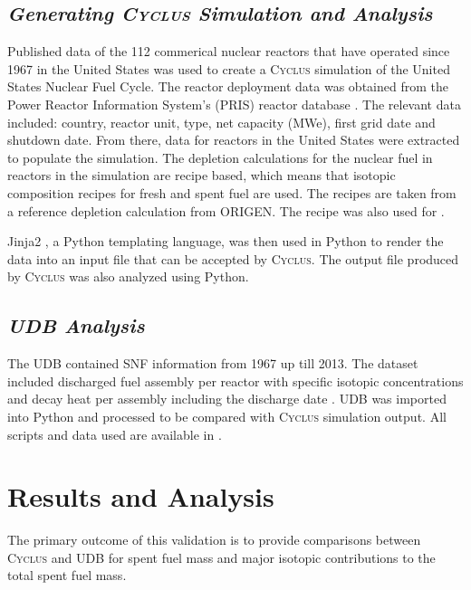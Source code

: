 \documentclass{anstrans}
\newcommand{\Cyclus}{\textsc{Cyclus}\xspace}%
\begin{document}
\subsection{\textit{Generating \Cyclus Simulation and Analysis}}
Published data of the 112 commerical nuclear reactors that have operated since 1967 in the United States was used to create a \Cyclus simulation of the United States Nuclear Fuel Cycle. The reactor deployment data was obtained from the Power Reactor Information System's (PRIS) reactor database \cite{IAEA_PRIS_2017}. The relevant data included: country, reactor unit, type, net capacity (MWe), first grid date and shutdown date. From there, data for reactors in the United States were extracted to populate the simulation. The depletion calculations for the nuclear fuel in reactors in the simulation are recipe based, which means that isotopic composition recipes for fresh and spent fuel are used. The recipes are taken from a reference depletion calculation from ORIGEN. The recipe was also used for \cite{Bae_Synergistic_2017 and Wilson_adoption_2009}. 

Jinja2 \cite{Ronacher_Jinja2_2018}, a Python templating language, was then used in Python to render the data into an input file that can be accepted by \Cyclus. The output file produced by \Cyclus was also analyzed using Python. 


\subsection{\textit{UDB Analysis}}
The UDB contained SNF information from 1967 up till 2013. The dataset included discharged fuel assembly per reactor with specific isotopic concentrations and decay heat per assembly including the discharge date \cite{Peterson_UNF_2017}. UDB was imported into Python and processed to be compared with \Cyclus simulation output. All scripts and data used are available in \cite{doi_transition_scenarios}. 
\section{Results and Analysis}
The primary outcome of this validation is to provide comparisons between \Cyclus and UDB  for spent fuel mass and major isotopic contributions to the total spent fuel mass. 
\end{document}
